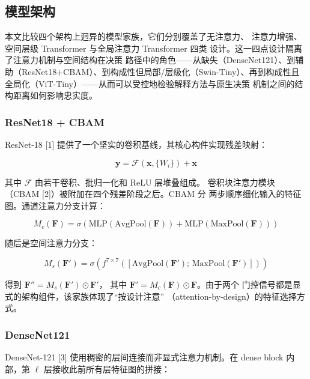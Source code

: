 \documentclass[11pt,a4paper]{article}
\begin{document}
\subsection{模型架构}

本文比较四个架构上迥异的模型家族，它们分别覆盖了无注意力、 注意力增强、空间层级 Transformer 与全局注意力 Transformer 四类 设计。这一四点设计隔离了注意力机制与空间结构在决策 路径中的角色——从缺失（DenseNet121）、到辅助（ResNet18+CBAM）、到构成性但局部/层级化（Swin-Tiny）、再到构成性且全局化（ViT-Tiny）——从而可以受控地检验解释方法与原生决策 机制之间的结构距离如何影响忠实度。

\subsubsection{ResNet18 + CBAM}

ResNet-18 [1] 提供了一个坚实的卷积基线，其核心构件实现残差映射：

\begin{equation}
\mathbf{y} = \mathcal{F}(\mathbf{x}, \{W_i\}) + \mathbf{x}
\tag{1}
\end{equation}

其中 $\mathcal{F}$ 由若干卷积、批归一化和 ReLU 层堆叠组成。 卷积块注意力模块（CBAM [2]）被附加在四个残差阶段之后。CBAM 分 两步顺序细化输入的特征图。通道注意力分支计算：

\begin{equation}
M_c(\mathbf{F}) = \sigma\!\left(\text{MLP}(\text{AvgPool}(\mathbf{F})) + \text{MLP}(\text{MaxPool}(\mathbf{F}))\right)
\tag{2}
\end{equation}

随后是空间注意力分支：

\begin{equation}
M_s(\mathbf{F}') = \sigma\!\left(f^{7{\times}7}\!\left([\text{AvgPool}(\mathbf{F}');\, \text{MaxPool}(\mathbf{F}')]\right)\right)
\tag{3}
\end{equation}

得到 $\mathbf{F}'' = M_s(\mathbf{F}') \odot \mathbf{F}'$， 其中 $\mathbf{F}' = M_c(\mathbf{F}) \odot \mathbf{F}$。由于两个 门控信号都是显式的架构组件，该家族体现了“按设计注意” （attention-by-design）的特征选择方式。

\subsubsection{DenseNet121}

DenseNet-121 [3] 使用稠密的层间连接而非显式注意力机制。在 dense block 内部，第 $\ell$ 层接收此前所有层特征图的拼接：
\end{document}
